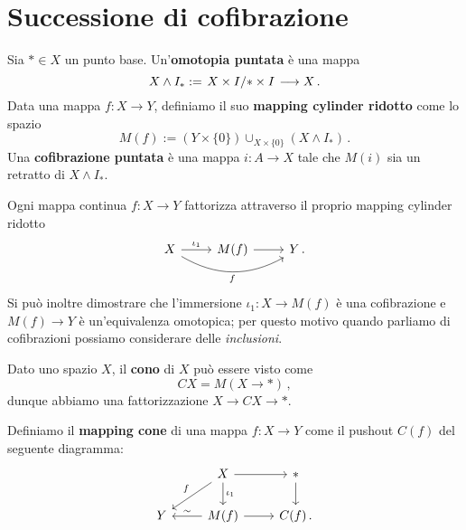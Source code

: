 \section{Successione di cofibrazione}

\begin{df}
	Sia $\ast \in X$ un punto base. Un'\textbf{omotopia puntata} è una mappa
	\begin{equation*}
		X \wedge I_{\ast} := \left. X \times I \middle/ \ast \times I \right. 
		\longrightarrow X\,.
	\end{equation*}
	Data una mappa $f:X \to Y$, definiamo il suo \textbf{mapping cylinder ridotto}
	come lo spazio
	\begin{equation*}
		M(f) := \left(Y \times \{0\}  \right) \cup_{X \times \{0\}} 
		\left(X \wedge I_{\ast}\right)\,.
	\end{equation*}
	Una \textbf{cofibrazione puntata} è una mappa $i:A \to X$
	tale che $M(i)$ sia un retratto di $X \wedge I_{\ast}$.
\end{df}

\begin{fact}
	Ogni mappa continua $f:X \to Y$ fattorizza attraverso
	il proprio mapping cylinder ridotto
	\begin{equation*}
		\begin{tikzcd}
			X \ar[r, "\iota_{1}"] \ar[rr, bend right, "f"']
			& M(f) \ar[r]
			& Y\,.
		\end{tikzcd}
	\end{equation*}
	Si può inoltre dimostrare che l'immersione $\iota_{1} : X \to M(f)$
	è una cofibrazione e $M(f) \to Y$ è un'equivalenza omotopica;
	per questo motivo quando parliamo di cofibrazioni possiamo 
	considerare delle \emph{inclusioni}.
\end{fact}

\begin{ex}
	Dato uno spazio $X$, il \textbf{cono} di $X$ può essere visto come
	\begin{equation*}
		CX = M(X \to \ast)\,,
	\end{equation*}
	dunque abbiamo una fattorizzazione $X \to CX \to \ast$.
\end{ex}

\begin{df}
	Definiamo il \textbf{mapping cone} di una mappa $f:X \to Y$
	come il pushout $C(f)$ del seguente diagramma:
	\begin{equation*}
		\begin{tikzcd}
			& X \ar[r] \ar[d, "\iota_{1}"]  \ar[dl,"f"'] & \ast \ar[d] \\
			Y & M(f) \ar[l, "\sim"'] \ar[r] & C(f)\,.
		\end{tikzcd}
	\end{equation*}
\end{df}

